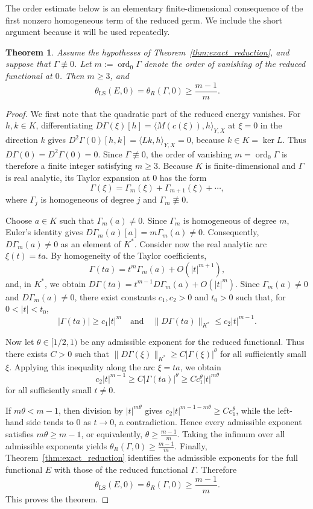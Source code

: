 \documentclass[11pt]{article}
\newtheorem{theorem}{Theorem}[section]
\theoremstyle{definition}
\theoremstyle{remark}
\begin{document}
The order estimate below is an elementary finite-dimensional consequence of the first nonzero homogeneous term of the reduced germ. We include the short argument because it will be used repeatedly.

\begin{theorem} \label{thm:order_bound} 
Assume the hypotheses of Theorem~\ref{thm:exact_reduction}, and suppose that $\Gamma \not\equiv 0$. Let $m := \operatorname{ord}_0 \Gamma$ denote the order of vanishing of the reduced functional at $0$. Then $m \ge 3$, and 
$$ \theta_{\mathrm{LS}}(E,0) = \theta_R(\Gamma,0) \ge \frac{m-1}{m}. $$
\end{theorem}  

\begin{proof} 
We first note that the quadratic part of the reduced energy vanishes. For $h,k\in K$, differentiating
$D\Gamma(\xi)[h]=\langle M(c(\xi)),h\rangle_{Y,X}$ at $\xi=0$ in the direction $k$ gives $D^2\Gamma(0)[h,k]=\langle Lk,h\rangle_{Y,X}=0$, because $k\in K=\ker L$. Thus $D\Gamma(0)=D^2\Gamma(0)=0$. Since $\Gamma\not\equiv0$,
the order of vanishing $m=\operatorname{ord}_0\Gamma$ is therefore a finite integer satisfying $m\ge3$.
Because $K$ is finite-dimensional and $\Gamma$ is real analytic, its Taylor expansion at $0$ has the form 
$$\Gamma(\xi) = \Gamma_m(\xi)+\Gamma_{m+1}(\xi)+\cdots, $$
where $\Gamma_j$ is homogeneous of degree $j$ and $\Gamma_m\not\equiv0$.  

\smallskip
Choose $a\in K$ such that $\Gamma_m(a)\neq0$. Since $\Gamma_m$ is homogeneous of degree $m$, Euler's identity gives $D\Gamma_m(a)[a] = m\Gamma_m(a)\neq0$. Consequently, $D\Gamma_m(a)\neq0$ as an element of $K^*$.  
Consider now the real analytic arc $\xi(t)=ta$. By homogeneity of the Taylor coefficients, 
$$\Gamma(ta) = t^m\Gamma_m(a)+O(|t|^{m+1}), $$
and, in $K^*$, we obtain $ D\Gamma(ta) = t^{m-1}D\Gamma_m(a)+O(|t|^m)$. 
Since $\Gamma_m(a)\neq0$ and $D\Gamma_m(a)\neq0$, there exist constants $c_1,c_2>0$ and $t_0>0$ such that, for $0<|t|<t_0$, 
$$ |\Gamma(ta)|\ge c_1|t|^m \quad \text{and} \quad \|D\Gamma(ta)\|_{K^*}\le c_2|t|^{m-1}. $$  

\smallskip
Now let $\theta\in[1/2,1)$ be any admissible exponent for the reduced functional. Thus there exists $C>0$ such that 
$ \|D\Gamma(\xi)\|_{K^*} \ge C|\Gamma(\xi)|^\theta $
for all sufficiently small $\xi$. Applying this inequality along the arc $\xi=ta$, we obtain 
$$ c_2|t|^{m-1} \ge C|\Gamma(ta)|^\theta \ge Cc_1^\theta |t|^{m\theta}  $$
for all sufficiently small $t\neq0$.  

\smallskip
If $m\theta < m-1$, then division by $|t|^{m\theta}$ gives $c_2|t|^{m-1-m\theta} \ge Cc_1^\theta$, while the left-hand side tends to $0$ as $t\to0$, a contradiction. Hence every admissible exponent satisfies $m\theta\ge m-1$, or equivalently, $\theta\ge\frac{m-1}{m}$. Taking the infimum over all admissible exponents yields 
$\theta_R(\Gamma,0)\ge\frac{m-1}{m}$.  
Finally, Theorem~\ref{thm:exact_reduction} identifies the admissible exponents for the full functional $E$ with those of the reduced functional $\Gamma$. Therefore 
$$\theta_{\mathrm{LS}}(E,0) = \theta_R(\Gamma,0) \ge \frac{m-1}{m}. $$
This proves the theorem. 
\end{proof}
\end{document}
